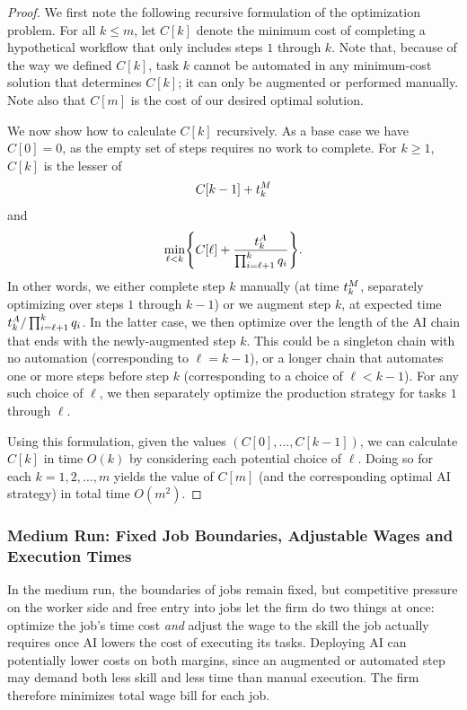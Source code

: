 \begin{proof}
We first note the following recursive formulation of the optimization problem.
For all $k \leq m$, let $C[k]$ denote the minimum cost of completing a hypothetical workflow that only includes steps $1$ through $k$.
Note that, because of the way we defined $C[k]$, task $k$ cannot be automated in any minimum-cost solution that determines $C[k]$; it can only be augmented or performed manually.
Note also that $C[m]$ is the cost of our desired optimal solution.

We now show how to calculate $C[k]$ recursively.
As a base case we have $C[0] = 0$, as the empty set of steps requires no work to complete.
For $k \geq 1$, $C[k]$ is the lesser of
\[ C[k-1] + t^{M}_{k} \]
and
\[ \min_{\ell < k} \Biggl\{ C[\ell] + \frac{t^{A}_{k}}{\prod_{i=\ell+1}^k q_i} \Biggr\}.
\]
In other words, we either complete step $k$ manually (at time $t^{M}_{k}$, separately optimizing over steps $1$ through $k-1$) or we augment step $k$, at expected time $t^{A}_{k}/\prod_{i=\ell+1}^k q_i$.
In the latter case, we then optimize over the length of the AI chain that ends with the newly-augmented step $k$.
This could be a singleton chain with no automation (corresponding to $\ell = k-1$), or a longer chain that automates one or more steps before step $k$ (corresponding to a choice of $\ell < k-1$).
For any such choice of $\ell$, we then separately optimize the production strategy for tasks $1$ through $\ell$.

Using this formulation, given the values $(C[0], \dotsc, C[k-1])$, we can calculate $C[k]$ in time $O(k)$ by considering each potential choice of $\ell$.
Doing so for each $k = 1, 2, \dotsc, m$ yields the value of $C[m]$ (and the corresponding optimal AI strategy) in total time $O(m^2)$.
\end{proof}



\subsubsection{Medium Run: Fixed Job Boundaries, Adjustable Wages and Execution Times}
\label{sec:model.mediumrun}
In the medium run, the boundaries of jobs remain fixed, but competitive pressure on the worker side and free entry into jobs let the firm do two things at once: optimize the job's time cost \emph{and} adjust the wage to the skill the job actually requires once AI lowers the cost of executing its tasks.
Deploying AI can potentially lower costs on both margins, since an augmented or automated step may demand both less skill and less time than manual execution.
The firm therefore minimizes total wage bill for each job.

